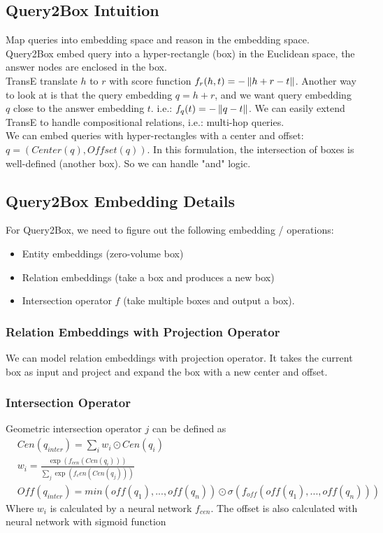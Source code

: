 \subsection{Query2Box Intuition} 
Map queries into embedding space and reason in the embedding space. Query2Box embed query into a hyper-rectangle (box) in the Euclidean space, the answer nodes are enclosed in the box. \\

TransE translate $h$ to $r$ with score function $f_r(h,t)=-\left\lVert h+r-t\right\rVert$. Another way to look at is that the query embedding $q = h + r$, and we want query embedding $q$ close to the answer embedding $t$. i.e.: $f_q(t) = -\left\lVert q-t\right\rVert$. We can easily extend TransE to handle compositional relations, i.e.: multi-hop queries. \\

We can embed queries with hyper-rectangles with a center and offset: $q = (Center(q), Offset(q))$. In this formulation, the intersection of boxes is well-defined (another box). So we can handle "and" logic. 


\subsection{Query2Box Embedding Details} 
For Query2Box, we need to figure out the following embedding / operations: 
    \begin{itemize}
        \item Entity embeddings (zero-volume box)
        \item Relation embeddings (take a box and produces a new box)
        \item Intersection operator $f$ (take multiple boxes and output a box). 
    \end{itemize}
    
\subsubsection{Relation Embeddings with Projection Operator} 
We can model relation embeddings with projection operator. It takes the current box as input and project and expand the box with a new center and offset. 

\subsubsection{Intersection Operator} 
Geometric intersection operator $j$ can be defined as 
    \begin{align*}
        & Cen(q_{inter}) = \sum_i w_i \odot Cen(q_i)\\
        & w_i = \frac{\exp(f_{cen}(Cen(q_i)))}{\sum_j \exp(f_cen(Cen(q_j)))}\\
        & Off(q_{inter}) = min(off(q_1),...,off(q_n)) \odot \sigma(f_{off}(off(q_1), ..., off(q_n)))
    \end{align*}
Where $w_i$ is calculated by a neural network $f_{cen}$. The offset is also calculated with neural network with sigmoid function 

